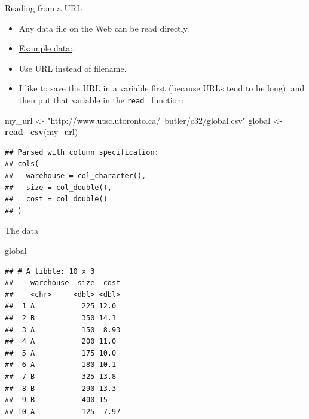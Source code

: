 \documentclass[ignorenonframetext,]{beamer}
\newenvironment{Shaded}{\begin{snugshade}}{\end{snugshade}}
\newcommand{\KeywordTok}[1]{\textcolor[rgb]{0.13,0.29,0.53}{\textbf{#1}}}
\newcommand{\NormalTok}[1]{#1}
\newcommand{\StringTok}[1]{\textcolor[rgb]{0.31,0.60,0.02}{#1}}
\providecommand{\tightlist}{%
  \setlength{\itemsep}{0pt}\setlength{\parskip}{0pt}}
\begin{document}
\begin{frame}[fragile]{Reading from a URL}
\protect\hypertarget{reading-from-a-url}{}

\begin{itemize}
\tightlist
\item
  Any data file on the Web can be read directly.
\item
  \href{http://www.utsc.utoronto.ca/~butler/c32/global.csv}{Example
  data:}.
\item
  Use URL instead of filename.
\item
  I like to save the URL in a variable first (because URLs tend to be
  long), and then put that variable in the \texttt{read\_} function:
\end{itemize}

\small

\begin{Shaded}
\begin{Highlighting}[]
\NormalTok{my_url <-}\StringTok{ "http://www.utsc.utoronto.ca/~butler/c32/global.csv"}
\NormalTok{global <-}\StringTok{ }\KeywordTok{read_csv}\NormalTok{(my_url)}
\end{Highlighting}
\end{Shaded}

\begin{verbatim}
## Parsed with column specification:
## cols(
##   warehouse = col_character(),
##   size = col_double(),
##   cost = col_double()
## )
\end{verbatim}

\normalsize

\end{frame}

\begin{frame}[fragile]{The data}
\protect\hypertarget{the-data}{}

\begin{Shaded}
\begin{Highlighting}[]
\NormalTok{global}
\end{Highlighting}
\end{Shaded}

\begin{verbatim}
## # A tibble: 10 x 3
##    warehouse  size  cost
##    <chr>     <dbl> <dbl>
##  1 A           225 12.0 
##  2 B           350 14.1 
##  3 A           150  8.93
##  4 A           200 11.0 
##  5 A           175 10.0 
##  6 A           180 10.1 
##  7 B           325 13.8 
##  8 B           290 13.3 
##  9 B           400 15   
## 10 A           125  7.97
\end{verbatim}

\end{frame}
\end{document}
